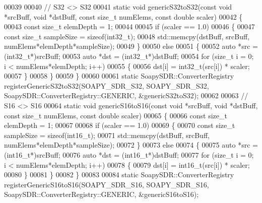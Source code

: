 \begin{DoxyCode}
00039 
00040 \textcolor{comment}{// S32 <> S32}
00041 \textcolor{keyword}{static} \textcolor{keywordtype}{void} genericS32toS32(\textcolor{keyword}{const} \textcolor{keywordtype}{void} *srcBuff, \textcolor{keywordtype}{void} *dstBuff, \textcolor{keyword}{const} \textcolor{keywordtype}{size\_t} numElems, \textcolor{keyword}{const} \textcolor{keywordtype}{double} scaler)
00042 \{
00043   \textcolor{keyword}{const} \textcolor{keywordtype}{size\_t} elemDepth = 1;
00044 
00045   \textcolor{keywordflow}{if} (scaler == 1.0)
00046     \{
00047       \textcolor{keyword}{const} \textcolor{keywordtype}{size\_t} sampleSize = \textcolor{keyword}{sizeof}(int32\_t);
00048       std::memcpy(dstBuff, srcBuff, numElems*elemDepth*sampleSize);
00049     \}
00050   \textcolor{keywordflow}{else}
00051     \{
00052       \textcolor{keyword}{auto} *src = (int32\_t*)srcBuff;
00053       \textcolor{keyword}{auto} *dst = (int32\_t*)dstBuff;
00054       \textcolor{keywordflow}{for} (\textcolor{keywordtype}{size\_t} i = 0; i < numElems*elemDepth; i++)
00055     \{
00056       dst[i] = int32\_t(src[i]) * scaler;
00057     \}
00058     \}
00059 \}
00060 
00061 \textcolor{keyword}{static} SoapySDR::ConverterRegistry registerGenericS32toS32(SOAPY_SDR_S32, 
      SOAPY_SDR_S32, SoapySDR::ConverterRegistry::GENERIC, &genericS32toS32);
00062 
00063 \textcolor{comment}{// S16 <> S16}
00064 \textcolor{keyword}{static} \textcolor{keywordtype}{void} genericS16toS16(\textcolor{keyword}{const} \textcolor{keywordtype}{void} *srcBuff, \textcolor{keywordtype}{void} *dstBuff, \textcolor{keyword}{const} \textcolor{keywordtype}{size\_t} numElems, \textcolor{keyword}{const} \textcolor{keywordtype}{double} scaler)
00065 \{
00066   \textcolor{keyword}{const} \textcolor{keywordtype}{size\_t} elemDepth = 1;
00067 
00068   \textcolor{keywordflow}{if} (scaler == 1.0)
00069     \{
00070       \textcolor{keyword}{const} \textcolor{keywordtype}{size\_t} sampleSize = \textcolor{keyword}{sizeof}(int16\_t);
00071       std::memcpy(dstBuff, srcBuff, numElems*elemDepth*sampleSize);
00072     \}
00073   \textcolor{keywordflow}{else}
00074     \{
00075       \textcolor{keyword}{auto} *src = (int16\_t*)srcBuff;
00076       \textcolor{keyword}{auto} *dst = (int16\_t*)dstBuff;
00077       \textcolor{keywordflow}{for} (\textcolor{keywordtype}{size\_t} i = 0; i < numElems*elemDepth; i++)
00078     \{
00079       dst[i] = int16\_t(src[i]) * scaler;
00080     \}
00081     \}
00082 \}
00083 
00084 \textcolor{keyword}{static} SoapySDR::ConverterRegistry registerGenericS16toS16(SOAPY_SDR_S16, 
      SOAPY_SDR_S16, SoapySDR::ConverterRegistry::GENERIC, &genericS16toS16);

\end{DoxyCode}
